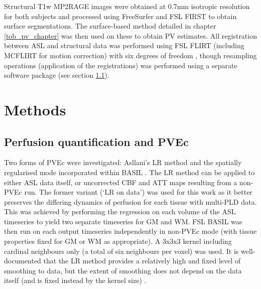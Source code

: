 Structural T1w MP2RAGE images were obtained at 0.7mm isotropic resolution for both subjects and processed using FreeSurfer and FSL FIRST to obtain surface segmentations. The surface-based method detailed in chapter \ref{tob_pv_chapter} was then used on these to obtain PV estimates. All registration between ASL and structural data was performed using FSL FLIRT (including MCFLIRT for motion correction) with six degrees of freedom \cite{flirt}, though resampling operations (application of the registrations) was performed using a separate software package (see section \ref{pvec_resamp_perf_methods}). 

\section{Methods}

\subsection{Perfusion quantification and PVEc}
\label{pvec_resamp_perf_methods}

Two forms of PVEc were investigated: Asllani's LR method \cite{Asllani2008} and the spatially regularised mode incorporated within BASIL \cite{Chappell2009, Chappell2011}. The LR method can be applied to either ASL data itself, or uncorrected  CBF and ATT maps resulting from a non-PVEc run. The former variant (`LR on data') was used for this work as it better preserves the differing dynamics of perfusion for each tissue with multi-PLD data. This was achieved by performing the regression on each volume of the ASL timeseries to yield two separate timeseries for GM and WM. FSL BASIL was then run on each output timeseries independently in non-PVEc mode (with tissue properties fixed for GM or WM as appropriate). A 3x3x3 kernel including cardinal neighbours only (a total of six neighbours per voxel) was used. It is well-documented that the LR method provides a relatively high and fixed level of smoothing to data, but the extent of smoothing does not depend on the data itself (and is fixed instead by the kernel size) \cite{Asllani2008, Zhao2017a}. 

